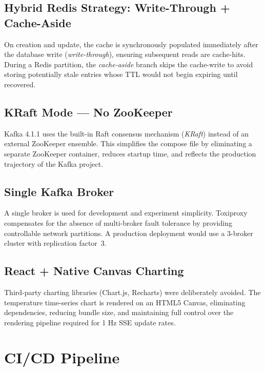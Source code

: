 \documentclass[12pt,a4paper,twoside]{article}
\begin{document}
\subsection{Hybrid Redis Strategy: Write-Through + Cache-Aside}

On creation and update, the cache is synchronously populated
immediately after the database write (\emph{write-through}), ensuring
subsequent reads are cache-hits.
During a Redis partition, the \emph{cache-aside} branch skips the
cache-write to avoid storing potentially stale entries whose TTL would
not begin expiring until recovered.

\subsection{KRaft Mode — No ZooKeeper}

Kafka 4.1.1 uses the built-in Raft consensus mechanism (\emph{KRaft})
instead of an external ZooKeeper ensemble.
This simplifies the compose file by eliminating a separate ZooKeeper
container, reduces startup time, and reflects the production trajectory
of the Kafka project.

\subsection{Single Kafka Broker}

A single broker is used for development and experiment simplicity.
Toxiproxy compensates for the absence of multi-broker fault tolerance
by providing controllable network partitions.
A production deployment would use a 3-broker cluster with replication
factor~3.

\subsection{React + Native Canvas Charting}

Third-party charting libraries (Chart.js, Recharts) were deliberately
avoided.
The temperature time-series chart is rendered on an HTML5 Canvas,
eliminating dependencies, reducing bundle size, and maintaining full
control over the rendering pipeline required for 1 Hz SSE update rates.

\section{CI/CD Pipeline}
\label{sec:cicd}
\end{document}
